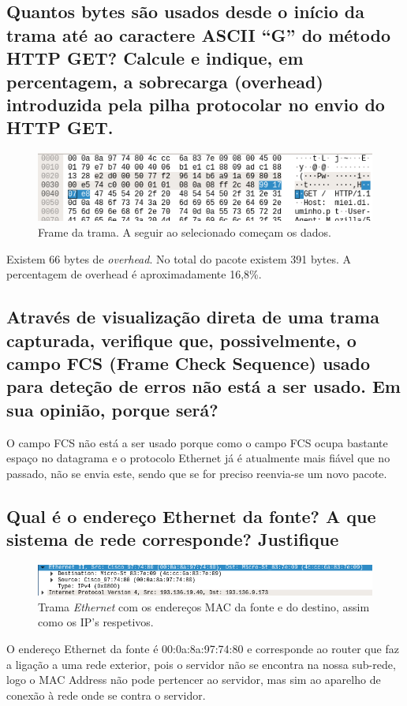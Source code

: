 \documentclass[a4paper]{article}
\begin{document}
 \subsection{Quantos bytes são	usados desde	o	início	da	trama até	ao	caractere	ASCII	“G”	do	
método HTTP	GET? Calcule	e	indique,	em	percentagem,	a	sobrecarga (overhead)	
introduzida pela	pilha	protocolar no	envio	do	HTTP	GET.}
\begin{figure}[H]
\centering
\includegraphics[scale=0.60]{pics/p4.png}
\caption{Frame da trama. A seguir ao selecionado começam os dados.}
\end{figure}
Existem 66 bytes de \textit{overhead}. No total do pacote existem 391 bytes. A percentagem de overhead é aproximadamente 16,8\%.
 
 \subsection{Através	 de	 visualização	 direta	 de	 uma	 trama	 capturada,	 verifique	 que,	
possivelmente, o	 campo	 FCS	 (Frame	 Check	 Sequence) usado	 para	 deteção	 de	
erros	não	está	a	ser	usado.	Em	sua	opinião, porque	será?}
O campo FCS não está a ser usado porque como o campo FCS ocupa bastante espaço no datagrama e o protocolo Ethernet já é atualmente mais fiável que no passado, não se envia este, sendo que se for preciso reenvia-se um novo pacote. 

\subsection{Qual	 é	 o	 endereço	 Ethernet da	 fonte?	 A	 que	 sistema	 de	 rede	 corresponde?	
Justifique}
\begin{figure}[H]
\centering
\includegraphics[scale=0.50]{pics/p6.png}
\caption{Trama \textit{Ethernet} com os endereços MAC da fonte e do destino, assim como os IP's respetivos.}
\end{figure}
O endereço Ethernet da fonte é 00:0a:8a:97:74:80 e corresponde ao router que faz a ligação a uma rede exterior, pois o servidor não se encontra na nossa sub-rede, logo o MAC Address não pode pertencer ao servidor, mas sim ao aparelho de conexão à rede onde se contra o servidor.
\end{document}
